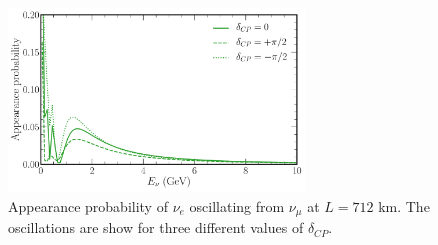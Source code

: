 \begin{figure} %
    \includegraphics[origin=c,width=0.7\textwidth]{diagrams/3-theory/explore_osc_cp_probs.pdf}
    \caption[osc cp probs short]
    {Appearance probability of $\nu_{e}$ oscillating from $\nu_{\mu}$ at $L=712$ km. The
        oscillations are show for three different values of $\delta_{CP}$.}
    \label{fig:osc_cp_probs}
\end{figure} %